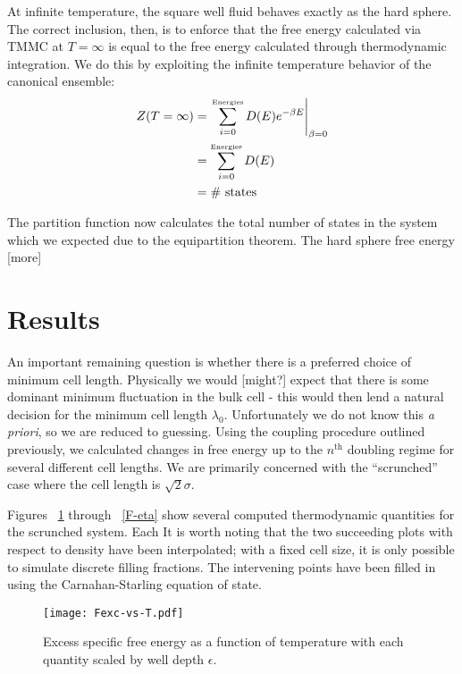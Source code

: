 \documentclass[12pt]{article}
\newcommand{\ignore}[1]{}
\begin{document}
At infinite temperature, the square well fluid behaves exactly as the hard sphere. The correct inclusion, then, is to enforce that the free energy calculated via TMMC at $T=\infty$ is equal to the free energy calculated through thermodynamic integration. We do this by exploiting the infinite temperature behavior of the canonical ensemble:
\begin{align}
    Z(T=\infty) &= \left.\sum_{i=0}^{\text{\tiny Energies}} D(E) e^{-\beta E}\right|_{\beta = 0}\\
    &= \sum_{i=0}^{\text{\tiny Energies}} D(E)\\
    &= \#\text{~states}
\end{align}

\ignore{NB: cough cough the HS energy probs wrong}
The partition function now calculates the total number of states in the system which we expected due to the equipartition theorem. The hard sphere free energy [more] 




\section{Results}
An important remaining question is whether there is a preferred choice of minimum cell length. Physically we would [might?] expect that there is some dominant minimum fluctuation in the bulk cell - this would then lend a natural decision for the minimum cell length $\lambda_0$. Unfortunately we do not know this {\it a priori}, so we are reduced to guessing. Using the coupling procedure outlined previously, we calculated changes in free energy up to the $n^{\text{th}}$ doubling regime for several different cell lengths. We are primarily concerned with the ``scrunched'' case where the cell length is $\sqrt2\sigma$.

Figures ~\ref{F-T} through ~\ref{F-eta} show several computed thermodynamic quantities for the scrunched system. Each  It is worth noting that the two succeeding plots with respect to density have been interpolated; with a fixed cell size, it is only possible to simulate discrete filling fractions. The intervening points have been filled in using the Carnahan-Starling equation of state.  
\begin{figure}[H]
\centering
    \texttt{[image: Fexc-vs-T.pdf]}
    \caption{Excess specific free energy as a function of temperature with each quantity scaled by well depth $\epsilon$. }
    \label{F-T}
\end{figure}
\end{document}
